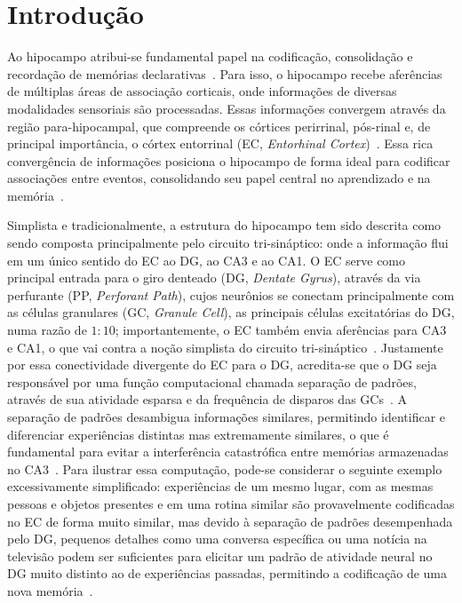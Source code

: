 \chapter{Introdução}

Ao hipocampo atribui-se fundamental papel na codificação, consolidação e recordação de memórias
declarativas~\cite{eichenbaumHippocampus1999}. Para isso, o hipocampo recebe aferências de múltiplas áreas de associação
corticais, onde informações de diversas modalidades sensoriais são processadas. Essas informações convergem através da região
para-hipocampal, que compreende os córtices perirrinal, pós-rinal e, de principal importância, o córtex entorrinal (EC,
\textit{Entorhinal Cortex})~\cite{eichenbaumCortical2000}. Essa rica convergência de informações posiciona o hipocampo de forma
ideal para codificar associações entre eventos, consolidando seu papel central no aprendizado e na memória~\cite{henkeModel2010,
berdugo-vegaSharpening2023}.

Simplista e tradicionalmente, a estrutura do hipocampo tem sido descrita como sendo composta principalmente pelo circuito
tri-sináptico: onde a informação flui em um único sentido do EC ao DG, ao CA3 e ao CA1. O EC serve como principal entrada para o
giro denteado (DG, \textit{Dentate Gyrus}), através da via perfurante (PP, \textit{Perforant Path}), cujos neurônios se conectam
principalmente com as células granulares (GC, \textit{Granule Cell}), as principais células excitatórias do DG, numa razão de
$1:10$; importantemente, o EC também envia aferências para CA3 e CA1, o que vai contra a noção simplista do circuito
tri-sináptico~\cite{basuCorticohippocampal2015}. Justamente por essa conectividade divergente do EC para o DG, acredita-se que o
DG seja responsável por uma função computacional chamada separação de padrões, através de sua atividade esparsa e da frequência de
disparos das GCs~\cite{hainmuellerDentate2020, kesnerMnemonic2006, yassaPattern2011}. A separação de padrões desambigua
informações similares, permitindo identificar e diferenciar experiências distintas mas extremamente similares, o que é fundamental
para evitar a interferência catastrófica entre memórias armazenadas no CA3~\cite{rollsMechanisms2013}. Para ilustrar essa
computação, pode-se considerar o seguinte exemplo excessivamente simplificado: experiências de um mesmo lugar, com as mesmas
pessoas e objetos presentes e em uma rotina similar são provavelmente codificadas no EC de forma muito similar, mas devido à
separação de padrões desempenhada pelo DG, pequenos detalhes como uma conversa específica ou uma notícia na televisão podem ser
suficientes para elicitar um padrão de atividade neural no DG muito distinto ao de experiências passadas, permitindo a codificação
de uma nova memória~\cite{eichenbaumHippocampus2004}.


